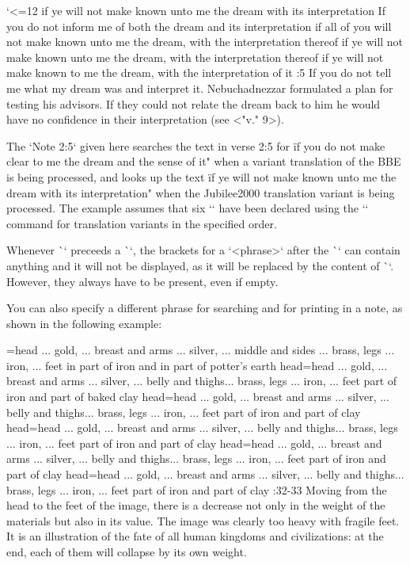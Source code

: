 \begtt \typosize[8/11] \catcode`<=12
    {if ye will not make known unto me the dream with its interpretation} %
    {If you do not inform me of both the dream and its interpretation} %
    {if all of you will not make known unto me the dream, with the interpretation thereof} %
    {if ye will not make known unto me the dream, with the interpretation thereof} %
    {if ye will not make known to me the dream, with the interpretation of it} %
:5 {If you do not tell me what my dream was and interpret it.}
    Nebuchadnezzar formulated a plan for testing his advisors. If they could not relate the dream back 
    to him he would have no confidence in their interpretation (see <"v." 9>). 
\endtt

The `Note 2:5` given here searches the text in verse 2:5 for \"if you do not make clear to me the 
dream and the sense of it" when a variant translation of the BBE is being processed, and looks up 
the text \"if ye will not make known unto me the dream with its interpretation" when the Jubilee2000 
translation variant is being processed.
The example assumes that six `\variants` have been declared using the 
`\variants` command for translation variants in the specified order. 

Whenever \`\ww` preceeds a \`\Note`, the brackets for a `{<phrase>}` after the \`\Note` can contain anything and it will not be displayed, as it will be replaced by the content of \`\ww`. However, they always have to be present, even if empty.

You can also specify a different phrase
for searching and for printing in a note, as shown in the following example:

\begtt \typosize[8/11]
={head ... gold, ... breast and arms ... silver, ... middle and sides ... brass, legs ... 
        iron, ... feet in part of iron and in part of potter's earth} %
    {head}={head ... gold, ... breast and arms ... silver, ... belly and thighs... brass, legs ... 
        iron, ... feet  part of iron and part of baked clay} %
    {head}={head ... gold, ... breast and arms ... silver, ... belly and thighs... brass, legs ... 
        iron, ... feet  part of iron and part of clay} %
    {head}={head ... gold, ... breast and arms ... silver, ... belly and thighs... brass, legs ... 
        iron, ... feet  part of iron and part of clay} %
    {head}={head ... gold, ... breast and arms ... silver, ... belly and thighs... brass, legs ... 
        iron, ... feet  part of iron and part of clay} %
    {head}={head ... gold, ... breast and arms ... silver, ... belly and thighs... brass, legs ... 
        iron, ... feet  part of iron and part of clay} %
:32-33 {} Moving from the head to the feet of the image, there is a decrease not only in the  
    weight of the materials but also in its value. The image was clearly too heavy with fragile feet.
    It is an illustration of the fate of all human kingdoms and civilizations:  at the end, each 
    of them will collapse by its own weight.
\endtt

